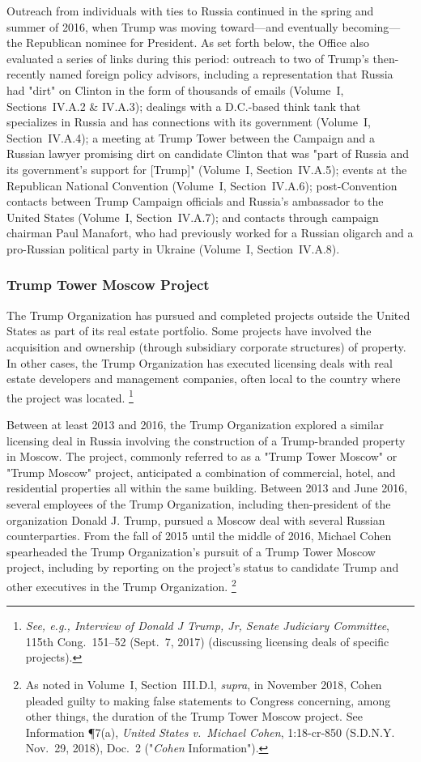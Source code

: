 Outreach from individuals with ties to Russia continued in the spring and summer of 2016, when Trump was moving toward---and eventually becoming---the Republican nominee for President.
As set forth below, the Office also evaluated a series of links during this period: outreach to two of Trump's then-recently named foreign policy advisors, including a representation that Russia had "dirt" on Clinton in the form of thousands of emails (Volume~I, Sections~IV.A.2 \& IV.A.3);
dealings with a D.C.-based think tank that specializes in Russia and has connections with its government (Volume~I, Section~IV.A.4);
a meeting at Trump Tower between the Campaign and a Russian lawyer promising dirt on candidate Clinton that was "part of Russia and its government's support for [Trump]" (Volume~I, Section~IV.A.5);
events at the Republican National Convention (Volume~I, Section~IV.A.6);
post-Convention contacts between Trump Campaign officials and Russia's ambassador to the United States (Volume~I, Section~IV.A.7);
and contacts through campaign chairman Paul Manafort, who had previously worked for a Russian oligarch and a pro-Russian political party in Ukraine (Volume~I, Section~IV.A.8).

\subsubsection{Trump Tower Moscow Project}

The Trump Organization has pursued and completed projects outside the United States as part of its real estate portfolio.
Some projects have involved the acquisition and ownership (through subsidiary corporate structures) of property.
In other cases, the Trump Organization has executed licensing deals with real estate developers and management companies, often local to the country where the project was located.%
\footnote{\textit{See, e.g., Interview of Donald J Trump, Jr, Senate Judiciary Committee}, 115th Cong.~151--52 (Sept.~7, 2017) (discussing licensing deals of specific projects).}

Between at least 2013 and 2016, the Trump Organization explored a similar licensing deal in Russia involving the construction of a Trump-branded property in Moscow.
The project, commonly referred to as a "Trump Tower Moscow" or "Trump Moscow" project, anticipated a combination of commercial, hotel, and residential properties all within the same building.
Between 2013 and June 2016, several employees of the Trump Organization, including then-president of the organization Donald J. Trump, pursued a Moscow deal with several Russian counterparties.
From the fall of 2015 until the middle of 2016, Michael Cohen spearheaded the Trump Organization's pursuit of a Trump Tower Moscow project, including by reporting on the project's status to candidate Trump and other executives in the Trump Organization.%
\footnote{As noted in Volume~I, Section~III.D.l, \textit{supra}, in November 2018, Cohen pleaded guilty to making false statements to Congress concerning, among other things, the duration of the Trump Tower Moscow project.
See Information \P 7(a), \textit{United States v.\ Michael Cohen}, 1:18-cr-850 (S.D.N.Y. Nov.~29, 2018), Doc.~2 ("\textit{Cohen} Information").}

